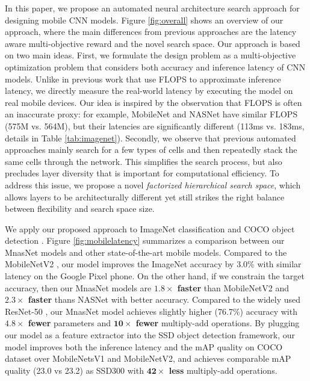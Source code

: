 \documentclass[10pt,twocolumn,letterpaper]{article}
\begin{document}
In this paper, we propose an automated neural architecture search approach for designing mobile CNN models. Figure \ref{fig:overall} shows an overview of our approach, where the main differences from previous approaches are the latency aware multi-objective reward and the novel search space.
Our approach is based on two main ideas. 
First, we formulate the design problem as a multi-objective optimization problem that considers both accuracy and inference latency of CNN models. Unlike in previous work \cite{nas_imagenet18,amoebanets18,diffnas18} that use FLOPS to approximate inference latency, we directly measure the real-world  latency by executing the model on real mobile devices. Our idea is inspired by the observation 
%
that FLOPS is often an inaccurate proxy: for example, MobileNet \cite{mobilenetv117} and NASNet \cite{nas_imagenet18} have similar FLOPS (575M vs. 564M), but their latencies are significantly different (113ms vs. 183ms, details in Table \ref{tab:imagenet}).
Secondly, we observe that previous automated approaches mainly search for a few types of cells and then repeatedly stack the same cells through the network. This simplifies the search process, but also precludes layer diversity that is important for computational efficiency. To address this issue, we propose a novel \emph{factorized hierarchical search space}, which allows layers to be architecturally different yet still strikes the right balance between flexibility and search space size.
%

%

We apply our proposed approach to ImageNet classification \cite{imagenet15} and COCO object detection \cite{coco14}.
%
Figure \ref{fig:mobilelatency} summarizes a comparison between our MnasNet models and other state-of-the-art mobile models.
Compared to the MobileNetV2 \cite{mobilenetv218}, our model improves the ImageNet accuracy by 3.0\% with similar latency on the Google Pixel phone. On the other hand, if we constrain the target accuracy, then our MnasNet models are  \textbf{$\mathbf{1.8\times}$ faster} than MobileNetV2 and \textbf{$\mathbf{2.3\times}$ faster} thans NASNet \cite{nas_imagenet18} with better accuracy. 
%
Compared to the widely used ResNet-50 \cite{resnet16}, our MnasNet model achieves slightly higher (76.7\%)  accuracy with \textbf{$\mathbf{4.8\times}$ fewer} parameters and \textbf{$\mathbf{10\times}$ fewer} multiply-add operations.
By plugging our model as a  feature extractor into the SSD object detection framework, our model improves both the inference latency and the mAP quality on COCO dataset over MobileNetsV1 and MobileNetV2, and achieves comparable mAP quality (23.0 vs 23.2) as SSD300 \cite{ssd16} with \textbf{$\mathbf{42\times}$ less}  multiply-add operations.
\end{document}
